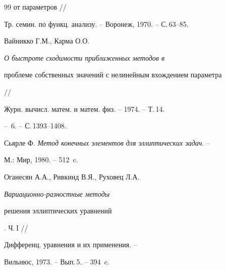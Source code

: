 \begin{thebibliography}{99}
{от параметров} //


Тр. семин. по функц. анализу. -- Воронеж, 1970. -- С.\,63--85.




Вайникко Г.М., Карма О.О. {\em О быстроте сходимости приближенных методов в


проблеме собственных значений с нелинейным вхождением параметра} //


Журн. вычисл. матем. и матем. физ. -- 1974. -- Т.\,14.


-- \No\,6. -- С.\,1393--1408.




Сьярле Ф. {\em Метод конечных элементов для эллиптических задач}. --


М.: Мир, 1980. -- 512~c.




Оганесян А.А., Ривкинд В.Я., Руховец Л.А. {\em Вариационно-разностные методы


решения эллиптических уравнений}. Ч.\,I //


Дифференц. уравнения и их применения. -- 


Вильнюс, 1973. -- Вып.\,5. -- 394~c.





\end{thebibliography}





\vskip 2cm












\label{end}








